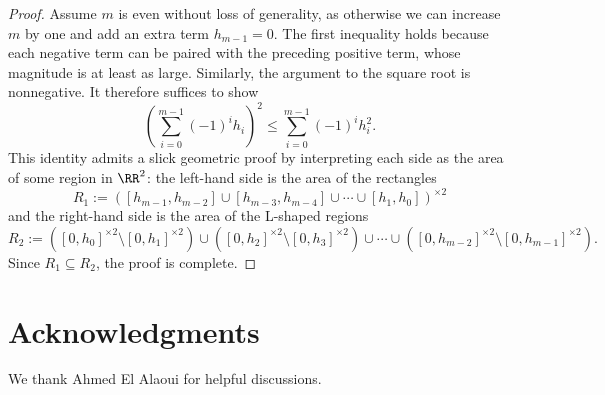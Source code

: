 \documentclass[11pt]{article}
\begin{document}
\begin{proof}
Assume $m$ is even without loss of generality, as otherwise we can increase $m$ by one and add an extra term $h_{m-1} = 0$. The first inequality holds because each negative term can be paired with the preceding positive term, whose magnitude is at least as large. Similarly, the argument to the square root is nonnegative. It therefore suffices to show
\[ \left(\sum_{i=0}^{m-1} (-1)^i h_i\right)^2 \le \sum_{i=0}^{m-1} (-1)^i h_i^2. \]
This identity admits a slick geometric proof by interpreting each side as the area of some region in $\RR^2$: the left-hand side is the area of the rectangles
\[ R_1 := ([h_{m-1},h_{m-2}] \cup [h_{m-3},h_{m-4}] \cup \cdots \cup [h_1,h_0])^{\times 2} \]
and the right-hand side is the area of the L-shaped regions
\[ R_2 := ([0,h_0]^{\times 2} \setminus [0,h_1]^{\times 2}) \cup ([0,h_2]^{\times 2} \setminus [0,h_3]^{\times 2}) \cup \cdots \cup ([0,h_{m-2}]^{\times 2} \setminus [0,h_{m-1}]^{\times 2}). \]
Since $R_1 \subseteq R_2$, the proof is complete.
\end{proof}





\section*{Acknowledgments}

We thank Ahmed El Alaoui for helpful discussions.





\end{document}
